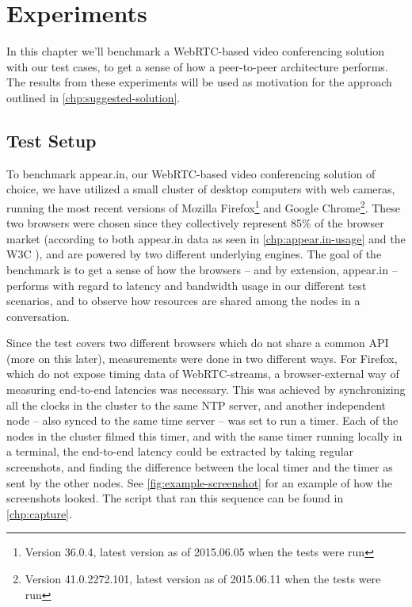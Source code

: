 \chapter{Experiments}\label{chp:experiments}

In this chapter we'll benchmark a WebRTC-based video conferencing solution with our test cases, to get a sense of how a peer-to-peer architecture performs. The results from these experiments will be used as motivation for the approach outlined in \autoref{chp:suggested-solution}.


\section{Test Setup}

To benchmark appear.in, our WebRTC-based video conferencing solution of choice, we have utilized a small cluster of desktop computers with web cameras, running the most recent versions of Mozilla Firefox\footnote{Version 36.0.4, latest version as of 2015.06.05 when the tests were run} and Google Chrome\footnote{Version 41.0.2272.101, latest version as of 2015.06.11 when the tests were run}. These two browsers were chosen since they collectively represent 85\% of the browser market (according to both appear.in data as seen in \autoref{chp:appear.in-usage} and the W3C \cite{browser-stats}), and are powered by two different underlying engines. The goal of the benchmark is to get a sense of how the browsers -- and by extension, appear.in -- performs with regard to latency and bandwidth usage in our different test scenarios, and to observe how resources are shared among the nodes in a conversation.

Since the test covers two different browsers which do not share a common API (more on this later), measurements were done in two different ways. For Firefox, which do not expose timing data of WebRTC-streams, a browser-external way of measuring end-to-end latencies was necessary. This was achieved by synchronizing all the clocks in the cluster to the same \gls{NTP} server, and another independent node -- also synced to the same time server -- was set to run a timer. Each of the nodes in the cluster filmed this timer, and with the same timer running locally in a terminal, the end-to-end latency could be extracted by taking regular screenshots, and finding the difference between the local timer and the timer as sent by the other nodes. See \autoref{fig:example-screenshot} for an example of how the screenshots looked. The script that ran this sequence can be found in \autoref{chp:capture}.

